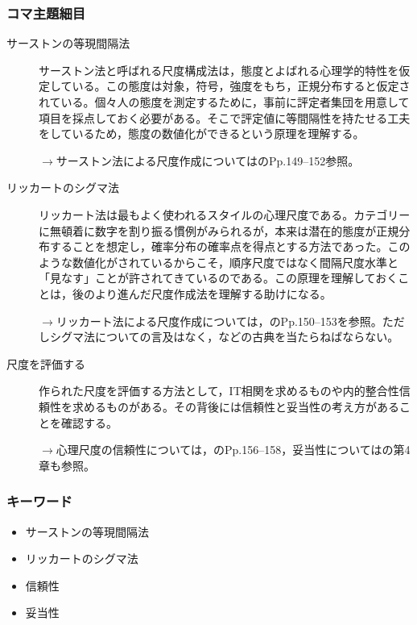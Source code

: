 \subsubsection{コマ主題細目}
\begin{description}
	\item[サーストンの等現間隔法]サーストン法と呼ばれる尺度構成法は，態度とよばれる心理学的特性を仮定している。この態度は対象，符号，強度をもち，正規分布すると仮定されている。個々人の態度を測定するために，事前に評定者集団を用意して項目を採点しておく必要がある。そこで評定値に等間隔性を持たせる工夫をしているため，態度の数値化ができるという原理を理解する。
	      \begin{flushright}
		      $\to$サーストン法による尺度作成については\citet{Suenaga1987}のPp.149--152参照。
	      \end{flushright}

	\item[リッカートのシグマ法]リッカート法は最もよく使われるスタイルの心理尺度である。カテゴリーに無頓着に数字を割り振る慣例がみられるが，本来は潜在的態度が正規分布することを想定し，確率分布の確率点を得点とする方法であった。このような数値化がされているからこそ，順序尺度ではなく間隔尺度水準と「見なす」ことが許されてきているのである。この原理を理解しておくことは，後のより進んだ尺度作成法を理解する助けになる。

	      \begin{flushright}
		      $\to$リッカート法による尺度作成については，\citet{Miyatani2009}のPp.150--153を参照。ただしシグマ法についての言及はなく，\citet{Tanaka197701}などの古典を当たらねばならない。
	      \end{flushright}

	\item[尺度を評価する] 作られた尺度を評価する方法として，IT相関を求めるものや内的整合性信頼性を求めるものがある。その背後には信頼性と妥当性の考え方があることを確認する。

	      \begin{flushright}
		      $\to$心理尺度の信頼性については，\citet{Suenaga1987}のPp.156--158，妥当性については\citet{kosugi2016b}の第4章も参照。
	      \end{flushright}

\end{description}
\subsubsection{キーワード}
\begin{itemize}
	\item サーストンの等現間隔法
	\item リッカートのシグマ法
	\item 信頼性
	\item 妥当性
\end{itemize}
